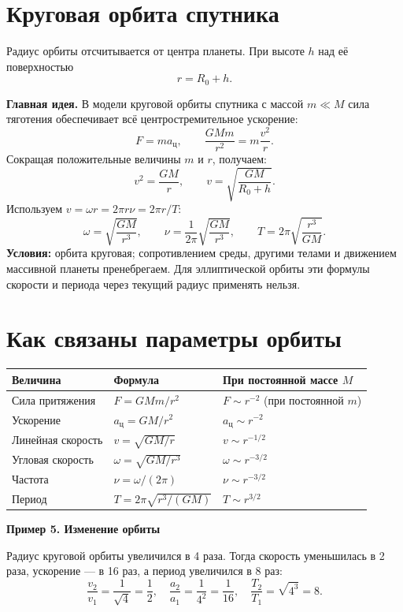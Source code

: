 \documentclass[a4paper,12pt]{article}
\newcommand{\key}[1]{\textcolor{darkaccent}{\textbf{#1}}}
\newcommand{\ex}[1]{\par\medskip\textbf{#1}\par}
\begin{document}
\section{Круговая орбита спутника}
Радиус орбиты отсчитывается от центра планеты. При высоте $h$ над её поверхностью
\[\boxed{r=R_0+h}.\]
\begin{center}
\end{center}
\key{Главная идея.} В модели круговой орбиты спутника с массой $m\ll M$ сила тяготения обеспечивает всё центростремительное ускорение:
\[F=ma_{\text{ц}},\qquad \frac{GMm}{r^2}=m\frac{v^2}{r}.\]
Сокращая положительные величины $m$ и $r$, получаем:
\[v^2=\frac{GM}{r},\qquad \boxed{v=\sqrt{\frac{GM}{R_0+h}}}.\]
Используем $v=\omega r=2\pi r\nu=2\pi r/T$:
\[\omega=\sqrt{\frac{GM}{r^3}},\qquad \nu=\frac1{2\pi}\sqrt{\frac{GM}{r^3}},\qquad T=2\pi\sqrt{\frac{r^3}{GM}}.\]
\key{Условия:} орбита круговая; сопротивлением среды, другими телами и движением массивной планеты пренебрегаем. Для эллиптической орбиты эти формулы скорости и периода через текущий радиус применять нельзя.
\clearpage
\section{Как связаны параметры орбиты}
\begin{center}
\renewcommand{\arraystretch}{1.35}
\begin{tabularx}{\linewidth}{@{}l l X@{}}
\toprule Величина & Формула & При постоянной массе $M$\\\midrule
Сила притяжения & $F=GMm/r^2$ & $F\sim r^{-2}$ (при постоянной $m$)\\
Ускорение & $a_{\text{ц}}=GM/r^2$ & $a_{\text{ц}}\sim r^{-2}$\\
Линейная скорость & $v=\sqrt{GM/r}$ & $v\sim r^{-1/2}$\\
Угловая скорость & $\omega=\sqrt{GM/r^3}$ & $\omega\sim r^{-3/2}$\\
Частота & $\nu=\omega/(2\pi)$ & $\nu\sim r^{-3/2}$\\
Период & $T=2\pi\sqrt{r^3/(GM)}$ & $T\sim r^{3/2}$\\\bottomrule
\end{tabularx}
\end{center}
\ex{Пример 5. Изменение орбиты}
Радиус круговой орбиты увеличился в 4 раза. Тогда скорость уменьшилась в 2 раза, ускорение --- в 16 раз, а период увеличился в 8 раз:
\[\frac{v_2}{v_1}=\frac1{\sqrt4}=\frac12,\quad \frac{a_2}{a_1}=\frac1{4^2}=\frac1{16},\quad \frac{T_2}{T_1}=\sqrt{4^3}=8.\]
\end{document}

